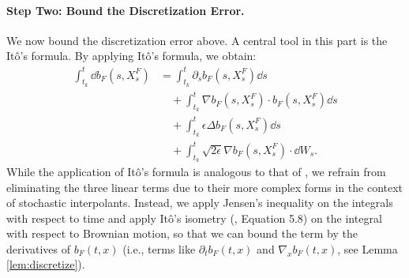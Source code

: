 \paragraph{Step Two: Bound the Discretization Error.} 
We now bound the discretization error above. 
A central tool in this part is the It\^o's formula. By applying It\^o's formula, we obtain:
\begin{equation}
    \begin{aligned}
        \int_{t_k}^t\dd b_F(s,X_s^F)&=\int_{t_k}^t\partial_sb_F(s,X_s^F)\dd s\\
        &\quad+\int_{t_k}^t\nabla b_F(s,X_s^F)\cdot b_F(s,X_s^F)\dd s\\
        &\quad+\int_{t_k}^t\epsilon\Delta b_F(s,X_s^F)\dd s\\
        &\quad+\int_{t_k}^t\sqrt{2\epsilon}\nabla b_F(s,X_s^F)\cdot\dd W_s.
    \end{aligned}
    \label{eq:ito-bf}
\end{equation}
While the application of It\^o's formula is analogous to that of \citet{dlinear}, we refrain from eliminating the three linear terms due to their more complex forms in the context of stochastic interpolants. Instead, we apply Jensen's inequality on the integrals with respect to time and apply It\^o's isometry (\citealt{le2016brownian}, Equation 5.8) on the integral with respect to Brownian motion, so that we can bound the term by the derivatives of $b_F(t,x)$ %
(i.e., terms like $\partial_tb_F(t,x)$ and $\nabla_xb_F(t,x)$, see Lemma \ref{lem:discretize}). 



